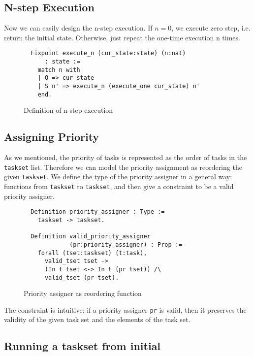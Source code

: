 \documentclass[nocopyrightspace]{sigplanconf}
\begin{document}
\subsection{N-step Execution}

Now we can easily design the n-step execution. If $n=0$, we execute zero step, i.e. return the initial state. Otherwise, just repeat the one-time execution n times.

\begin{figure}[H]
\begin{verbatim}
  Fixpoint execute_n (cur_state:state) (n:nat)
      : state :=
    match n with
    | O => cur_state
    | S n' => execute_n (execute_one cur_state) n'
    end.
\end{verbatim}
\caption{ Definition of n-step execution }\label{fig:n-step}
\end{figure}

\subsection{Assigning Priority}
As we mentioned, the priority of tasks is represented as the order of tasks in the \texttt{taskset} list. Therefore we can model the priority assignment as reordering the given \texttt{taskset}. We define the type of the priority assigner in a general way: functions from \texttt{taskset} to \texttt{taskset}, and then give a constraint to be a valid priority assigner.

\begin{figure}[H]
\begin{verbatim}
  Definition priority_assigner : Type :=
    taskset -> taskset.

  Definition valid_priority_assigner
             (pr:priority_assigner) : Prop :=
    forall (tset:taskset) (t:task),
      valid_tset tset ->
      (In t tset <-> In t (pr tset)) /\
      valid_tset (pr tset).
\end{verbatim}
\caption{ Priority assigner as reordering function }\label{fig:pa}
\end{figure}

The constraint is intuitive: if a priority assigner \texttt{pr} is valid, then it preserves the validity of the given task set and the elements of the task set.

\subsection{Running a taskset from initial}
\end{document}

